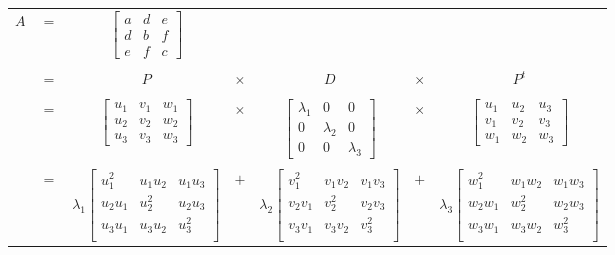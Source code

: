 \documentclass{article}
\begin{document}
\begin{tabular}{ccccccc}
\\
$A$
& $=$ &
$
\left[\begin{array}{ccc}
 a & d & e \\
 d & b & f \\
 e & f & c
\end{array}\right]
$
\\
\\
& $=$ &
$P$ & $\times$ & $D$ & $\times$ & $P^t$
\\
\\
& $=$ &
$
\left[\begin{array}{ccc}
 u_1 & v_1 & w_1 \\
 u_2 & v_2 & w_2 \\
 u_3 & v_3 & w_3
\end{array}\right]
$
& $\times$ &
$
\left[\begin{array}{ccc}
 \lambda_1 & 0         & 0 \\
 0         & \lambda_2 & 0 \\
 0         & 0         & \lambda_3
\end{array}\right]
$
& $\times$ &
$
\left[\begin{array}{ccc}
 u_1 & u_2 & u_3 \\
 v_1 & v_2 & v_3 \\
 w_1 & w_2 & w_3
\end{array}\right]
$
\\
\\
& $=$ &
$
\lambda_1
\left[\begin{array}{ccc}
 u_1^2  & u_1u_2 & u_1u_3 \\
 u_2u_1 & u_2^2  & u_2u_3 \\
 u_3u_1 & u_3u_2 & u_3^2  \\
\end{array}\right]
$
& $+$ &
$
\lambda_2
\left[\begin{array}{ccc}
 v_1^2  & v_1v_2 & v_1v_3 \\
 v_2v_1 & v_2^2  & v_2v_3 \\
 v_3v_1 & v_3v_2 & v_3^2  \\
\end{array}\right]
$
& $+$ &
$
\lambda_3
\left[\begin{array}{ccc}
 w_1^2  & w_1w_2 & w_1w_3 \\
 w_2w_1 & w_2^2  & w_2w_3 \\
 w_3w_1 & w_3w_2 & w_3^2  \\
\end{array}\right]
$
\\

\end{tabular}
\end{document}
